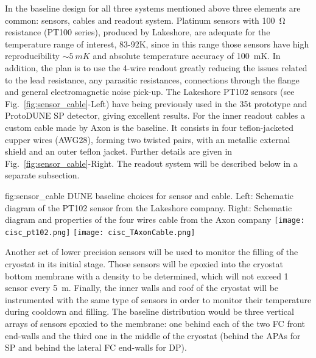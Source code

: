In the baseline design for all three systems mentioned above three elements are common: sensors, cables and readout system.
Platinum sensors with \SI{100}{\ohm} resistance (PT100 series), produced by Lakeshore,  
are adequate for the temperature range of interest, 83-92\si{K}, since in this range those sensors have high reproducibility 
$\sim\SI{5}{mK}$ and absolute temperature accuracy of \SI{100}{mK}.
In addition, the plan is to use the 4-wire readout greatly reducing the issues related to the lead resistance, any parasitic resistances,
connections through the flange and general electromagnetic noise pick-up. The Lakeshore PT102 sensors (see Fig.~\ref{fig:sensor_cable}-Left)
have being previously used in the 35t prototype and ProtoDUNE SP detector,
giving excellent results. For the inner readout cables a custom cable made by Axon is the baseline. It consists in four teflon-jacketed 
cupper wires (AWG28), forming two twisted pairs, with an metallic external shield
and an outer teflon jacket. Further details are given in Fig.~\ref{fig:sensor_cable}-Right. 
The readout system will be described below in a separate subsection. 


\begin{dunefigure}{fig:sensor_cable}
  {DUNE baseline choices for sensor and cable. Left: Schematic diagram of the PT102 sensor from the Lakeshore company. Right: Schematic diagram and properties of the four wires cable from the
  Axon company}
  \texttt{[image: cisc\_pt102.png]}
  \texttt{[image: cisc\_TAxonCable.png]}
\end{dunefigure}

Another set of lower precision sensors will be used to monitor the filling of the cryostat in its initial stage. Those sensors will be epoxied into the cryostat bottom membrane with
a density to be determined, which will not exceed 1 sensor every \SI{5}{m}. 
Finally, the inner walls and roof of the cryostat will be instrumented with the same type of sensors in order to monitor their temperature during cooldown and filling.
The baseline distribution would be three vertical arrays of sensors epoxied to the membrane: one behind each of the two FC front end-walls and the third one in the middle of the cryostat
(behind the APAs for SP and behind the lateral FC end-walls for DP). 

